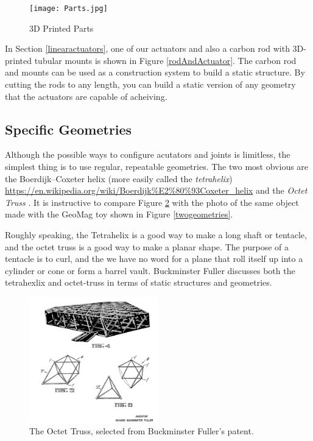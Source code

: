 \documentclass[11pt]{article}
\begin{document}
\begin{figure}[!ht]
  \centering
    \texttt{[image: Parts.jpg]}
    \caption[3D Printed Parts]{3D Printed Parts}
      \label{parts}
\end{figure}

In Section \ref{linearactuators}, one of our actuators and also a carbon rod with 3D-printed tubular mounts
is shown in Figure \ref{rodAndActuator}.
The carbon rod and mounts can be used as a construction system to build a static structure.
By cutting the rods to any length, you can build a static version of any geometry that the actuators
are capable of acheiving.

\subsection{Specific Geometries}

Although the possible ways to configure acutators and joints is limitless, the simplest thing is to
use regular, repeatable geometries. The two most obvious are the Boerdijk–Coxeter helix
(more easily called the \textit{tetrahelix})
\url{https://en.wikipedia.org/wiki/Boerdijk%E2%80%93Coxeter_helix}
  and the \emph{Octet Truss}
  \cite{richard1961synergetic}.
  It is instructive to compare Figure \ref{octet-truss-patent} with the photo of the same object
  made with the GeoMag toy shown in Figure \ref{twogeometries}.
    
Roughly speaking, the Tetrahelix is a good way to make a long shaft or tentacle, and the octet truss
is a good way to make a planar shape. The purpose of a tentacle is to curl, and the we have no word for
a plane that roll itself up into a cylinder or cone or form a barrel vault. Buckminster Fuller discusses
both the tetrahexlix and octet-truss \cite{fuller1982synergetics} in terms of static structures and geometries.

\begin{figure}[!ht]
  \centering
    \includegraphics[width=0.5\textwidth]{OctetTrussSelection.png}
    \caption[The Octet Truss]{The Octet Truss, selected from Buckminster Fuller's patent.}
      \label{octet-truss-patent}
\end{figure}
\end{document}
